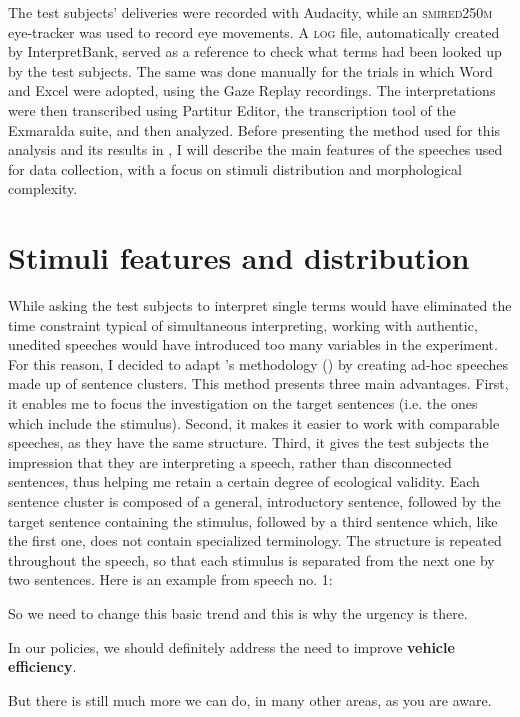 \documentclass[output=paper]{langsci/langscibook}
\begin{document}
The test subjects’ deliveries were recorded with Audacity, while an \textsc{smi\linebreak red250m} eye-tracker was used to record eye movements. A \textsc{log} file, automatically created by InterpretBank, served as a reference to check what terms had been looked up by the test subjects. The same was done manually for the trials in which Word and Excel were adopted, using the Gaze Replay recordings. The interpretations were then transcribed using Partitur Editor, the transcription tool of the Exmaralda suite, and then analyzed. Before presenting the method used for this analysis and its results in , I will describe the main features of the speeches used for data collection, with a focus on stimuli distribution and morphological complexity.

\section{Stimuli features and distribution}\label{sec:prandi:4}
While asking the test subjects to interpret single terms would have eliminated the time constraint typical of simultaneous interpreting, working with authentic, unedited speeches would have introduced too many variables in the experiment. For this reason, I decided to adapt \citeauthor{Seeber2011a}’s methodology (\citeyear{Seeber2011a}) by creating ad-hoc speeches made up of sentence clusters. This method presents three main advantages. First, it enables me to focus the investigation on the target sentences (i.e. the ones which include the stimulus). Second, it makes it easier to work with comparable speeches, as they have the same structure. Third, it gives the test subjects the impression that they are interpreting a speech, rather than disconnected sentences, thus helping me retain a certain degree of ecological validity. Each sentence cluster is composed of a general, introductory sentence, followed by the target sentence containing the stimulus, followed by a third sentence which, like the first one, does not contain specialized terminology. The structure is repeated throughout the speech, so that each stimulus is separated from the next one by two sentences. Here is an example from speech no. 1:

\ea
So we need to change this basic trend and this is why the urgency is there.

In our policies, we should definitely address the need to improve \textbf{vehicle efficiency}.

But there is still much more we can do, in many other areas, as you are aware.
\end{document}
